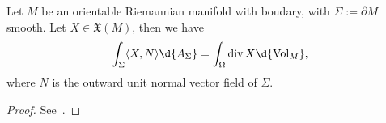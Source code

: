 \begin{thm}
    Let $M$ be an orientable Riemannian manifold with boudary, with $\Sigma:=\partial M$ smooth.
    Let $X\in\mathfrak{X}(M)$, then we have
    \[\int_\Sigma\langle X,N\rangle\d{A_\Sigma}=\int_\Omega\div{X}\d{\Vol_M},\]
    where $N$ is the outward unit normal vector field of $\Sigma$.
\end{thm}
\begin{proof}
    See~\cite[Theorem~16.32]{Lee}.
\end{proof}